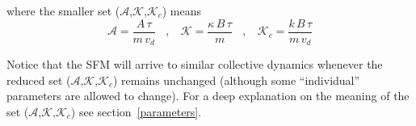 \documentclass[preprint,12pt]{elsarticle}
\begin{document}
\noindent where the smaller set ($\mathcal{A}$,$\mathcal{K}$,$\mathcal{K}_c$) 
means\\

\begin{equation}
 \mathcal{A}=\displaystyle\frac{A\,\tau}{m\,v_d}\ \ \ \ , \ \ \ \ 
 \mathcal{K}=\displaystyle\frac{\kappa\,B\,\tau}{m}\ \ \ \ , \ \ \ \
 \mathcal{K}_c=\displaystyle\frac{k\,B\,\tau}{m\,v_d}
\end{equation}

Notice that the SFM will arrive to similar collective dynamics whenever the 
reduced set ($\mathcal{A}$,$\mathcal{K}$,$\mathcal{K}_c$) remains unchanged 
(although some ``individual'' parameters are allowed to change). For a deep 
explanation on the meaning  of the set 
($\mathcal{A}$,$\mathcal{K}$,$\mathcal{K}_c$) see section~\ref{parameters}. \\








\end{document}
